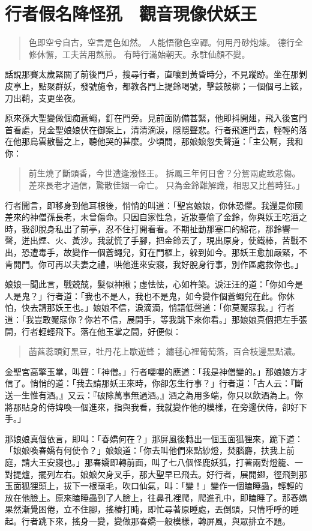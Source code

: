 
\chapter{行者假名降怪犼　觀音現像伏妖王}

\begin{quote}
色即空兮自古，空言是色如然。
人能悟徹色空禪。何用丹砂炮煉。
德行全修休懈，工夫苦用熬煎。
有時行滿始朝天。永駐仙顏不變。
\end{quote}

話說那賽太歲緊關了前後門戶，搜尋行者，直嚷到黃昏時分，不見蹤跡。坐在那剝皮亭上，點聚群妖，發號施令，都教各門上提鈴喝號，擊鼓敲梆；一個個弓上絃，刀出鞘，支更坐夜。

原來孫大聖變做個痴蒼蠅，釘在門旁。見前面防備甚緊，他即抖開翅，飛入後宮門首看處，見金聖娘娘伏在御案上，清清滴淚，隱隱聲悲。行者飛進門去，輕輕的落在他那烏雲散髻之上，聽他哭的甚麼。少頃間，那娘娘忽失聲道：「主公啊，我和你：
\begin{quote}
前生燒了斷頭香，今世遭逢潑怪王。
拆鳳三年何日會？分鴛兩處致悲傷。
差來長老才通信，驚散佳姻一命亡。
只為金鈴難解識，相思又比舊時狂。」
\end{quote}

行者聞言，即移身到他耳根後，悄悄的叫道：「聖宮娘娘，你休恐懼。我還是你國差來的神僧孫長老，未曾傷命。只因自家性急，近妝臺偷了金鈴，你與妖王吃酒之時，我卻脫身私出了前亭，忍不住打開看看。不期扯動那塞口的綿花，那鈴響一聲，迸出煙、火、黃沙。我就慌了手腳，把金鈴丟了，現出原身，使鐵棒，苦戰不出，恐遭毒手，故變作一個蒼蠅兒，釘在門樞上，躲到如今。那妖王愈加嚴緊，不肯開門。你可再以夫妻之禮，哄他進來安寢，我好脫身行事，別作區處救你也。」

娘娘一聞此言，戰兢兢，髮似神揪；虛怯怯，心如杵築。淚汪汪的道：「你如今是人是鬼？」行者道：「我也不是人，我也不是鬼，如今變作個蒼蠅兒在此。你休怕，快去請那妖王也。」娘娘不信，淚滴滴，悄語低聲道：「你莫魘寐我。」行者道：「我豈敢魘寐你？你若不信，展開手，等我跳下來你看。」那娘娘真個把左手張開，行者輕輕飛下。落在他玉掌之間，好便似：
\begin{quote}
菡萏蕊頭釘黑豆，牡丹花上歇遊蜂；
繡毬心裡葡萄落，百合枝邊黑點濃。
\end{quote}

金聖宮高擎玉掌，叫聲：「神僧。」行者嚶嚶的應道：「我是神僧變的。」那娘娘方才信了。悄悄的道：「我去請那妖王來時，你卻怎生行事？」行者道：「古人云：『斷送一生惟有酒。』又云：『破除萬事無過酒。』酒之為用多端，你只以飲酒為上。你將那貼身的侍婢喚一個進來，指與我看，我就變作他的模樣，在旁邊伏侍，卻好下手。」

那娘娘真個依言，即叫：「春嬌何在？」那屏風後轉出一個玉面狐狸來，跪下道：「娘娘喚春嬌有何使令？」娘娘道：「你去叫他們來點紗燈，焚腦麝，扶我上前庭，請大王安寢也。」那春嬌即轉前面，叫了七八個怪鹿妖狐，打著兩對燈籠、一對提爐，擺列左右。娘娘欠身叉手，那大聖早已飛去。好行者，展開翅，徑飛到那玉面狐狸頭上，拔下一根毫毛，吹口仙氣，叫：「變！」變作一個瞌睡蟲，輕輕的放在他臉上。原來瞌睡蟲到了人臉上，往鼻孔裡爬，爬進孔中，即瞌睡了。那春嬌果然漸覺困倦，立不住腳，搖樁打盹，即忙尋著原睡處，丟倒頭，只情呼呼的睡起。行者跳下來，搖身一變，變做那春嬌一般模樣，轉屏風，與眾排立不題。

